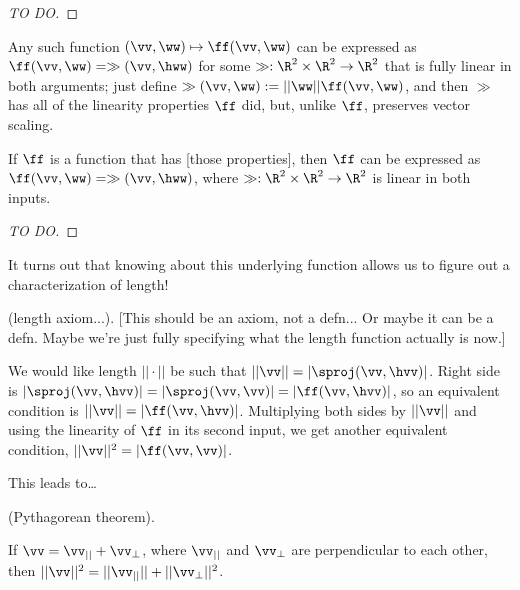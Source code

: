 \begin{proof}
	[TO DO]
\end{proof}

Any such function $(\vv, \ww) \mapsto \ff(\vv, \ww)$ can be expressed as $\ff(\vv, \ww) = \gg(\vv, \hww)$ for some $\gg:\R^2 \times \R^2 \rightarrow \R^2$ that is fully linear in both arguments; just define $\gg(\vv, \ww) := ||\ww|| \ff(\vv, \ww)$, and then $\gg$ has all of the linearity properties $\ff$ did, but, unlike $\ff$, preserves vector scaling.

\begin{theorem}
	If $\ff$ is a function that	has [those properties], then $\ff$ can be expressed as $\ff(\vv, \ww) = \gg(\vv, \hww)$, where $\gg:\R^2 \times \R^2 \rightarrow \R^2$ is linear in both inputs. 
\end{theorem}

\begin{proof}
	[TO DO]
\end{proof}

It turns out that knowing about this underlying function allows us to figure out a characterization of length!

\begin{defn}
\label{ch::lin_alg::defn::length_in_R2}
	(length axiom...). [This should be an axiom, not a defn... Or maybe it can be a defn. Maybe we're just fully specifying what the length function actually is now.]
	
	We would like length $||\cdot||$ be such that $||\vv|| = |\sproj(\vv, \hvv)|$. Right side is $|\sproj(\vv, \hvv)| = |\sproj(\vv, \vv)| = |\ff(\vv, \hvv)|$, so an equivalent condition is $||\vv|| = |\ff(\vv, \hvv)|$. Multiplying both sides by $||\vv||$ and using the linearity of $\ff$ in its second input, we get another equivalent condition, $||\vv||^2 = |\ff(\vv, \vv)|$.
\end{defn}

This leads to…

\begin{theorem}
	(Pythagorean theorem).
	
	If $\vv = \vv_{||} + \vv_{\perp}$, where $\vv_{||}$ and $\vv_{\perp}$ are perpendicular to each other, then $||\vv||^2 = ||\vv_{||}|| + ||\vv_{\perp}||^2$.
\end{theorem}

